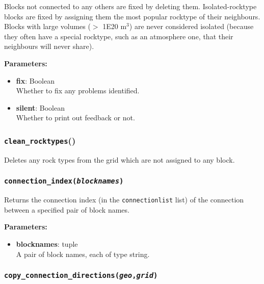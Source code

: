 Blocks not connected to any others are fixed by deleting them.  Isolated-rocktype blocks are fixed by assigning them the most popular rocktype of their neighbours.  Blocks with large volumes ($>$ 1E20 m$^3$) are never considered isolated (because they often have a special rocktype, such as an atmosphere one, that their neighbours will never share).

\textbf{Parameters:}
\begin{itemize}
\item \textbf{fix}: Boolean\\
  Whether to fix any problems identified.
\item \textbf{silent}: Boolean\\
  Whether to print out feedback or not.
\end{itemize}

\begin{snugshade}
\subsubsection{\texttt{clean\_rocktypes}()}
\end{snugshade}
\label{sec:t2grid:clean_rocktypes}

Deletes any rock types from the grid which are not assigned to any block.

\begin{snugshade}
\subsubsection{\texttt{connection\_index(\emph{blocknames})}}
\end{snugshade}
\label{sec:t2grid:connection_index}

Returns the connection index (in the \texttt{connectionlist} list) of the connection between a specified pair of block names.

\textbf{Parameters:}
\begin{itemize}
\item \textbf{blocknames}: tuple\\
  A pair of block names, each of type string.
\end{itemize}

\begin{snugshade}
\subsubsection{\texttt{copy\_connection\_directions(\emph{geo},\emph{grid})}}
\end{snugshade}
\label{sec:t2grid:copy_connection_directions}

